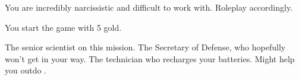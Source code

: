 \documentclass[char]{guildcamp3}
\begin{document}
\begin{itemz}[Notes]
	\item You are incredibly narcissistic and difficult to work with. Roleplay accordingly.  
	\item You start the game with 5 gold. 
\end{itemz}


\begin{contacts}
  \contact{\cSciOne{}} The senior scientist on this mission.
  \contact{\cPoliOne{}} The Secretary of Defense, who hopefully won't get in your way.
  \contact{\cTech{}} The technician who recharges your batteries. Might help you outdo \cSciOne{}.
\end{contacts}
\end{document}
